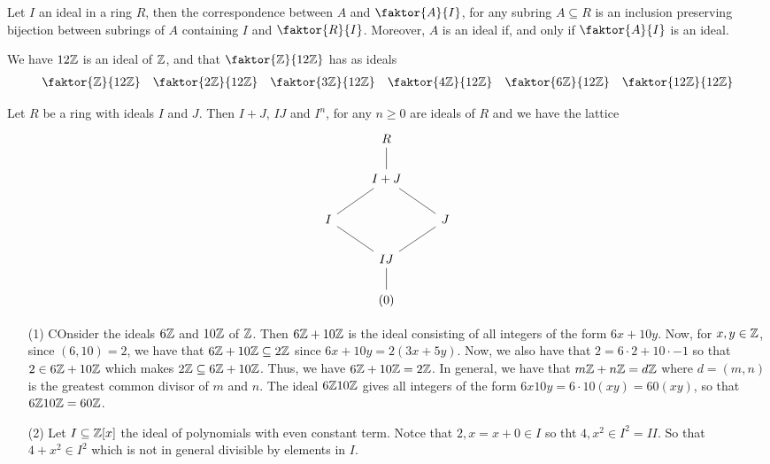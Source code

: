 \begin{theorem}\label{1.3.7}
    Let $I$ an ideal in a ring $R$, then the correspondence between  $A$ and
    $\faktor{A}{I}$, for any subring $A \subseteq R$ is an inclusion preserving
    bijection between subrings of $A$ containing  $I$ and  $\faktor{R}{I}$.
    Moreover, $A$ is an ideal if, and only if  $\faktor{A}{I}$ is an ideal.
\end{theorem}

\begin{example}\label{1.11}
    We have $12\mathbb{Z}$ is an ideal of  $\mathbb{Z}$, and that  $\faktor{\Z}{12\Z}$ has as
    ideals
    \begin{align*}
        \faktor{\Z}{12\Z} && \faktor{2\Z}{12\Z} && \faktor{3\Z}{12\Z} &&
        \faktor{4\Z}{12\Z} && \faktor{6\Z}{12\Z} && \faktor{12\Z}{12\Z}
    \end{align*}
\end{example}

\begin{lemma}\label{1.3.8}
    Let $R$ be a ring with ideals  $I$ and  $J$. Then  $I+J$,  $IJ$ and  $I^n$,
    for any  $n \geq 0$ are ideals of  $R$ and we have the lattice
    \[\begin{tikzcd}
	& R \\
	& {I+J} \\
	I && J \\
	& IJ \\
	& {(0)}
	\arrow[no head, from=1-2, to=2-2]
	\arrow[no head, from=2-2, to=3-1]
	\arrow[no head, from=3-1, to=4-2]
	\arrow[no head, from=4-2, to=3-3]
	\arrow[no head, from=3-3, to=2-2]
	\arrow[no head, from=4-2, to=5-2]
    \end{tikzcd}\]
\end{lemma}

\begin{example}\label{1.12}
    \begin{enumerate}
    \item[(1)] COnsider the ideals $6\mathbb{Z}$ and  $10\mathbb{Z}$ of $\mathbb{Z}$. Then $6\mathbb{Z}+10\mathbb{Z}$ is
        the ideal consisting of all integers of the form  $6x+10y$. Now, for
        $x,y \in \mathbb{Z}$, since $(6,10)=2$, we have that $6\mathbb{Z}+10\mathbb{Z} \subseteq 2\mathbb{Z}$
        since  $6x+10y=2(3x+5y)$. Now, we also have that $2=6 \cdot 2+10 \cdot
        -1$ so that  $2 \in 6\mathbb{Z}+10\mathbb{Z}$ which makes $2\mathbb{Z} \subseteq 6\mathbb{Z}+10\mathbb{Z}$.
        Thus, we have $6\mathbb{Z}+10\mathbb{Z}=2\mathbb{Z}$. In general, we have that $m\mathbb{Z}+n\mathbb{Z}=d\mathbb{Z}$
        where $d=(m,n)$ is the greatest common divisor of $m$ and  $n$. The
        ideal $6\mathbb{Z}10\mathbb{Z}$ gives all integers of the form $6x10y=6 \cdot 10
        (xy)=60(xy)$, so that $6\mathbb{Z}10\mathbb{Z}=60\mathbb{Z}$.

    \item[(2)] Let $I \subseteq \mathbb{Z}[x]$ the ideal of polynomials with even
        constant term. Notce that $2,x=x+0 \in I$ so tht  $4,x^2 \in I^2=II$. So
        that  $4+x^2\in I^2$ which is not in general divisible by elements in $I$.
    \end{enumerate}
\end{example}
